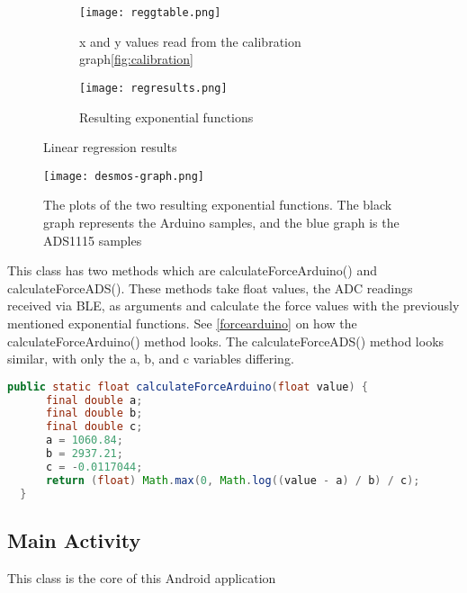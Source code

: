 \begin{figure}[h]
  \centering
  \begin{subfigure}{0.4\textwidth}
  \texttt{[image: reggtable.png]} 
  \caption{x and y values read from the calibration graph\ref{fig:calibration}}
  \label{fig:subim1}
  \end{subfigure}
  \begin{subfigure}{0.4\textwidth}
  \texttt{[image: regresults.png]}
  \caption{Resulting exponential functions }
  \label{fig:subim2}
  \end{subfigure}
  
  \caption{Linear regression results}
  \label{fig:image2}
  \end{figure}
  \begin{figure}[!htb]
    \centering
    \texttt{[image: desmos-graph.png]}
    \caption{The plots of the two resulting exponential functions. The black graph represents the Arduino samples, and the blue graph is the ADS1115 samples}
    \label{fig:desmosgraph}
  \end{figure}
\clearpage
  This class has two methods which are calculateForceArduino() and calculateForceADS(). These methods take float values, the ADC readings received via BLE, as arguments and calculate the force values with the previously mentioned exponential functions. See  \ref{forcearduino} on how the calculateForceArduino() method looks. The calculateForceADS() method looks similar, with only the a, b, and c variables differing. 

  \begin{lstlisting}[language=java,caption=Method that calculates the force of the ADC readings from the Arduino, label=forcearduino]
    public static float calculateForceArduino(float value) {
      final double a;
      final double b;
      final double c;
      a = 1060.84;
      b = 2937.21;
      c = -0.0117044;
      return (float) Math.max(0, Math.log((value - a) / b) / c);
  }
  \end{lstlisting}

  \subsection{Main Activity}

  This class is the core of this Android application

